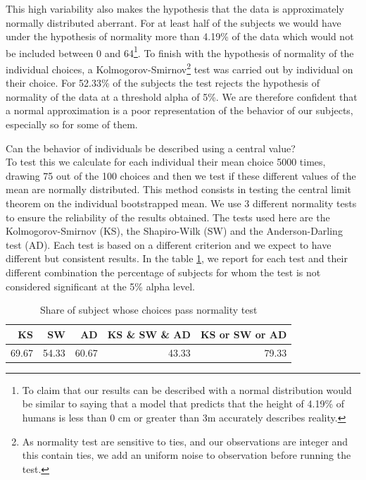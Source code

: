 \documentclass[
]{book}
\begin{document}
This high variability also makes the hypothesis that the data is
approximately normally distributed aberrant.
For at least half of the subjects
we would have under the hypothesis of normality more than
4.19\% of the data which would not be
included between 0 and 64\footnote{To claim that our results can be described with a normal distribution
  would be similar to saying that a model that predicts that the height of
  4.19\% of humans is less than 0 cm or greater
  than 3m accurately describes reality.}.
To finish with the hypothesis of normality of the individual choices, a
Kolmogorov-Smirnov\footnote{As normality test are sensitive to ties, and our observations are integer
  and this contain ties, we add an uniform noise to observation before running the
  test.} test was carried out by individual on their choice.
For 52.33\% of the subjects
the test rejects the hypothesis of normality of the data at a threshold
alpha of 5\%.
We are therefore confident that a normal approximation is a poor representation
of the behavior of our subjects, especially so for some of them.

Can the behavior of individuals be described using a central value?\\
To test this we calculate for
each individual their mean choice 5000 times, drawing 75 out of the 100 choices
and then we test if these different values of the mean are
normally distributed. This method consists in testing the central limit
theorem on the individual bootstrapped mean. We
use 3 different normality tests to ensure the reliability of the
results obtained. The tests used here are the Kolmogorov-Smirnov
(KS), the Shapiro-Wilk (SW) and the Anderson-Darling test (AD).
Each test is based on a different criterion and we expect to have
different but consistent results. In the table \ref{tab:norm-test4}, we report for each
test and their different combination the percentage of subjects for whom
the test is not considered significant at the 5\% alpha level.

\begin{table}

\caption{\label{tab:norm-test4}Share of subject whose choices pass normality test}
\centering
\begin{tabular}[t]{rrrrr}
\toprule
KS & SW & AD & KS \& SW \& AD & KS or SW or AD\\
\midrule
69.67 & 54.33 & 60.67 & 43.33 & 79.33\\
\bottomrule
\end{tabular}
\end{table}
\end{document}
